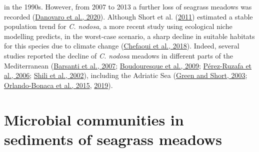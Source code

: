 \documentclass[
  12 pt,
]{book}
\begin{document}
in the 1990s. However, from 2007 to 2013 a further loss of seagrass meadows was recorded (\protect\hyperlink{ref-Danovaro2020}{Danovaro et al., 2020}). Although Short et al. (\protect\hyperlink{ref-Short2011}{2011}) estimated a stable population trend for \emph{C. nodosa}, a more recent study using ecological niche modelling predicts, in the worst-case scenario, a sharp decline in suitable habitats for this species due to climate change (\protect\hyperlink{ref-Chefaoui2018}{Chefaoui et al., 2018}). Indeed, several studies reported the decline of \emph{C. nodosa} meadows in different parts of the Mediterranean (\protect\hyperlink{ref-Barsanti2007}{Barsanti et al., 2007}; \protect\hyperlink{ref-Boudouresque2009}{Boudouresque et al., 2009}; \protect\hyperlink{ref-Perez-Ruzafa2006}{Pérez-Ruzafa et al., 2006}; \protect\hyperlink{ref-Shili2002}{Shili et al., 2002}), including the Adriatic Sea (\protect\hyperlink{ref-Green2003}{Green and Short, 2003}; \protect\hyperlink{ref-Orlando-Bonaca2015}{Orlando-Bonaca et al., 2015}, \protect\hyperlink{ref-Orlando-Bonaca2019}{2019}).

\hypertarget{microbial-communities-in-sediments-of-seagrass-meadows}{%
\section{Microbial communities in sediments of seagrass meadows}\label{microbial-communities-in-sediments-of-seagrass-meadows}}
\end{document}
